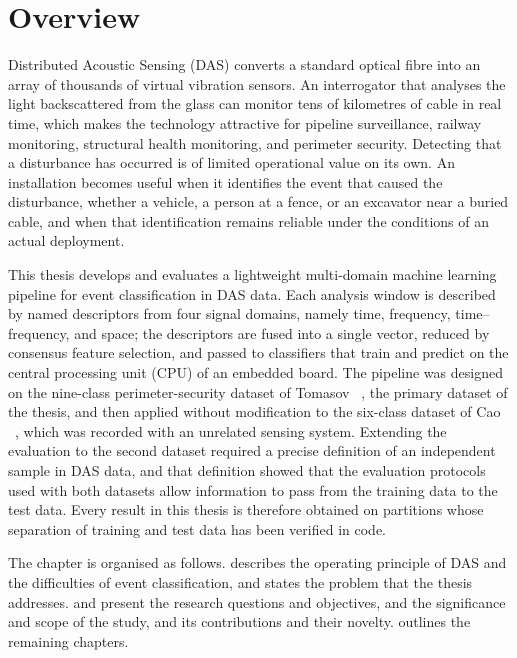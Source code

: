 \section{Overview}%
\label{sec:chap1Overview}
Distributed Acoustic Sensing (DAS) converts a standard optical fibre into an array of thousands of virtual vibration sensors. An interrogator that analyses the light backscattered from the glass can monitor tens of kilometres of cable in real time, which makes the technology attractive for pipeline surveillance, railway monitoring, structural health monitoring, and perimeter security. Detecting that a disturbance has occurred is of limited operational value on its own. An installation becomes useful when it identifies the event that caused the disturbance, whether a vehicle, a person at a fence, or an excavator near a buried cable, and when that identification remains reliable under the conditions of an actual deployment.

This thesis develops and evaluates a lightweight multi-domain machine learning pipeline for event classification in DAS data. Each analysis window is described by named descriptors from four signal domains, namely time, frequency, time--frequency, and space; the descriptors are fused into a single vector, reduced by consensus feature selection, and passed to classifiers that train and predict on the central processing unit (CPU) of an embedded board. The pipeline was designed on the nine-class perimeter-security dataset of Tomasov \etal~\cite{tomasov2025dataset}, the primary dataset of the thesis, and then applied without modification to the six-class dataset of Cao \etal~\cite{caoxin2023opendataset}, which was recorded with an unrelated sensing system. Extending the evaluation to the second dataset required a precise definition of an independent sample in DAS data, and that definition showed that the evaluation protocols used with both datasets allow information to pass from the training data to the test data. Every result in this thesis is therefore obtained on partitions whose separation of training and test data has been verified in code.

The chapter is organised as follows.  describes the operating principle of DAS and the difficulties of event classification, and  states the problem that the thesis addresses.  and  present the research questions and objectives,  and  the significance and scope of the study, and  its contributions and their novelty.  outlines the remaining chapters.

